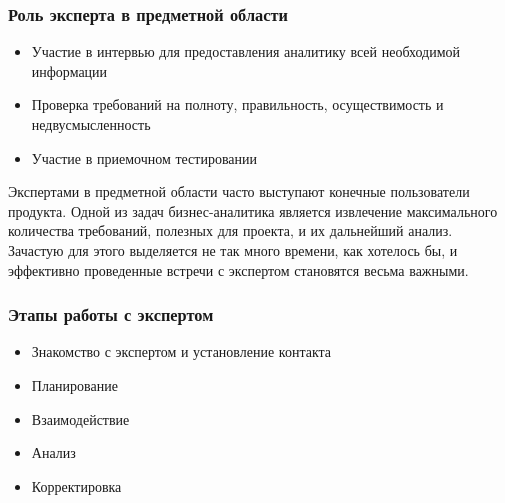 \documentclass{../industrial-development}
\begin{document}
\begin{frame} \frametitle{Роль эксперта в предметной области}
	\begin{itemize}
		\item Участие в интервью для предоставления аналитику всей необходимой информации
		\item Проверка требований на полноту, правильность, осуществимость и недвусмысленность
		\item Участие в приемочном тестировании
	\end{itemize}
\end{frame}

\lecturenotes
Экспертами в предметной области часто выступают конечные пользователи продукта.
Одной из задач бизнес-аналитика является извлечение максимального количества требований, полезных для проекта, и их дальнейший анализ. Зачастую для этого выделяется не так много времени, как хотелось бы, и эффективно проведенные встречи с экспертом становятся весьма важными.

\begin{frame} \frametitle{Этапы работы с экспертом}
	\begin{itemize}
		\item Знакомство с экспертом и установление контакта
		\item Планирование
		\item Взаимодействие
		\item Анализ
		\item Корректировка
	\end{itemize}
\end{frame}
\end{document}
